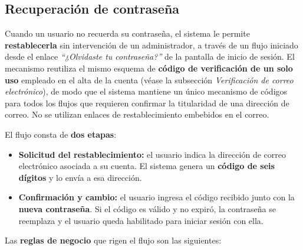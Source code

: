 \documentclass[a4paper,12pt]{article}
\begin{document}
    \subsection{Recuperación de contraseña}
    \par Cuando un usuario no recuerda su contraseña, el sistema le permite \textbf{restablecerla} sin intervención de un administrador, a través de un flujo iniciado desde el enlace \textit{``¿Olvidaste tu contraseña?''} de la pantalla de inicio de sesión. El mecanismo reutiliza el mismo esquema de \textbf{código de verificación de un solo uso} empleado en el alta de la cuenta (véase la subsección \textit{Verificación de correo electrónico}), de modo que el sistema mantiene un único mecanismo de códigos para todos los flujos que requieren confirmar la titularidad de una dirección de correo. No se utilizan enlaces de restablecimiento embebidos en el correo.
    \par El flujo consta de \textbf{dos etapas}:
    \begin{itemize}
        \item \textbf{Solicitud del restablecimiento:} el usuario indica la dirección de correo electrónico asociada a su cuenta. El sistema genera un \textbf{código de seis dígitos} y lo envía a esa dirección.
        \item \textbf{Confirmación y cambio:} el usuario ingresa el código recibido junto con la \textbf{nueva contraseña}. Si el código es válido y no expiró, la contraseña se reemplaza y el usuario queda habilitado para iniciar sesión con ella.
    \end{itemize}
    \par Las \textbf{reglas de negocio} que rigen el flujo son las siguientes:
\end{document}
